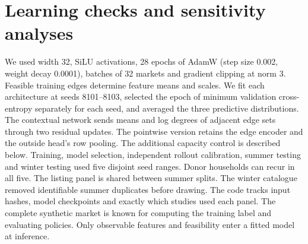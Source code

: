 \section{Learning checks and sensitivity analyses}\label{app:ai}
We used width 32, SiLU activations, 28 epochs of AdamW (step size 0.002, weight decay 0.0001), batches of 32 markets and gradient clipping at norm 3. Feasible training edges determine feature means and scales. We fit each architecture at seeds 8101--8103, selected the epoch of minimum validation cross-entropy separately for each seed, and averaged the three predictive distributions. The contextual network sends means and log degrees of adjacent edge sets through two residual updates. The pointwise version retains the edge encoder and the outside head's row pooling. The additional capacity control is described below. Training, model selection, independent rollout calibration, summer testing and winter testing used five disjoint seed ranges. Donor households can recur in all five. The listing panel is shared between summer splits. The winter catalogue removed identifiable summer duplicates before drawing. The code tracks input hashes, model checkpoints and exactly which studies used each panel. The complete synthetic market is known for computing the training label and evaluating policies. Only observable features and feasibility enter a fitted model at inference.



